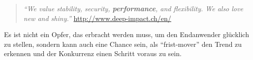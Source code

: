 	\begin{quote}
		\textit{"`We value stability, security, \textbf{performance}, and flexibility. We also love new and shiny."'} \url{http://www.deep-impact.ch/en/} 
	\end{quote}

	Es ist nicht ein Opfer, das erbracht werden muss, um den Endanwender glücklich zu stellen, sondern kann auch eine Chance sein, als "`frist-mover"' den Trend zu erkennen und der Konkurrenz einen Schritt voraus zu sein.




